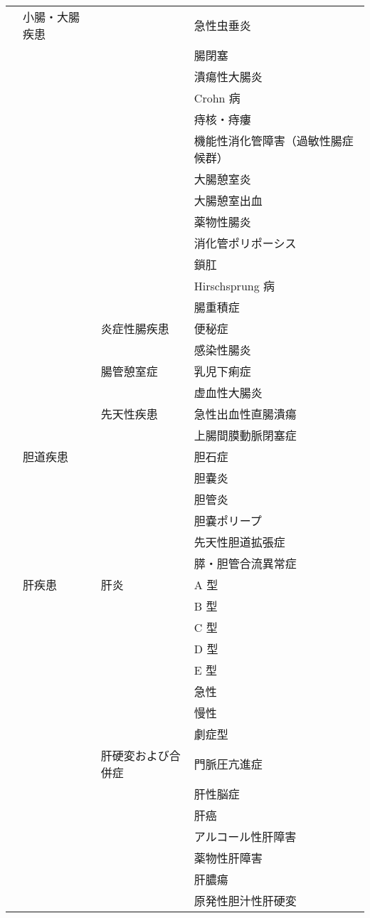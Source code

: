 \begin{xltabular}{\linewidth}{XXXX}
 & 小腸・大腸疾患 &  & 急性虫垂炎 \\
 &  &  & 腸閉塞 \\
 &  &  & 潰瘍性大腸炎 \\
 &  &  & Crohn 病 \\
 &  &  & 痔核・痔瘻 \\
 &  &  & 機能性消化管障害（過敏性腸症候群） \\
 &  &  & 大腸憩室炎 \\
 &  &  & 大腸憩室出血 \\
 &  &  & 薬物性腸炎 \\
 &  &  & 消化管ポリポーシス \\
 &  &  & 鎖肛 \\
 &  &  & Hirschsprung 病 \\
 &  &  & 腸重積症 \\
 &  & 炎症性腸疾患 & 便秘症 \\
 &  &  & 感染性腸炎 \\
 &  & 腸管憩室症 & 乳児下痢症 \\
 &  &  & 虚血性大腸炎 \\
 &  & 先天性疾患 & 急性出血性直腸潰瘍 \\
 &  &  & 上腸間膜動脈閉塞症 \\
 & 胆道疾患 &  & 胆石症 \\
 &  &  & 胆嚢炎 \\
 &  &  & 胆管炎 \\
 &  &  & 胆嚢ポリープ \\
 &  &  & 先天性胆道拡張症 \\
 &  &  & 膵・胆管合流異常症 \\
 & 肝疾患 & 肝炎 & A 型 \\
 &  &  & B 型 \\
 &  &  & C 型 \\
 &  &  & D 型 \\
 &  &  & E 型 \\
 &  &  & 急性 \\
 &  &  & 慢性 \\
 &  &  & 劇症型 \\
 &  & 肝硬変および合併症 & 門脈圧亢進症 \\
 &  &  & 肝性脳症 \\
 &  &  & 肝癌 \\
 &  &  & アルコール性肝障害 \\
 &  &  & 薬物性肝障害 \\
 &  &  & 肝膿瘍 \\
 &  &  & 原発性胆汁性肝硬変 \\

\end{xltabular}
